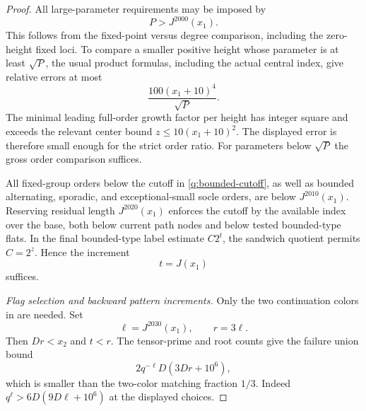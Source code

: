 \begin{proof}
All large-parameter requirements may be imposed by
\begin{equation}\label{q:bounded-cutoff}
                             P>J^{2000}(x_1).
\end{equation}
This follows from the fixed-point versus degree comparison, including
the zero-height fixed loci.  To compare a smaller positive height whose
parameter is at least $\sqrt P$, the usual product formulas, including
the actual central index, give relative errors at most
\[
                          \frac{100(x_1+10)^4}{\sqrt P}.
\]
The minimal leading full-order growth factor per height has integer
square and exceeds the relevant center bound
$z\le10(x_1+10)^2$.  The displayed error is therefore small enough
for the strict order ratio.  For parameters below $\sqrt P$ the gross
order comparison suffices.

All fixed-group orders below the cutoff in
\eqref{q:bounded-cutoff}, as well as bounded alternating, sporadic, and
exceptional-small socle orders, are below $J^{2010}(x_1)$.  Reserving
residual length $J^{2020}(x_1)$ enforces the cutoff by the available
index over the base, both below current path nodes and below tested
bounded-type flats.  In the final bounded-type label estimate $C2^t$,
the sandwich quotient permits $C=2^z$.  Hence the increment
\begin{equation}\label{q:t}
                              t=J(x_1)
\end{equation}
suffices.

\emph{Flag selection and backward pattern increments.}
Only the two continuation colors in  are needed.  Set
\begin{equation}\label{q:ell-r}
                 \ell=J^{2030}(x_1),\qquad r=3\ell.
\end{equation}
Then $Dr<x_2$ and $t<r$.  The tensor-prime and root counts give the
failure union bound
\begin{equation}\label{q:flag-error}
                     2q^{-\ell}D(3Dr+10^6),
\end{equation}
which is smaller than the two-color matching fraction $1/3$.
Indeed $q^\ell>6D(9D\ell+10^6)$ at the displayed choices.


\end{proof}
